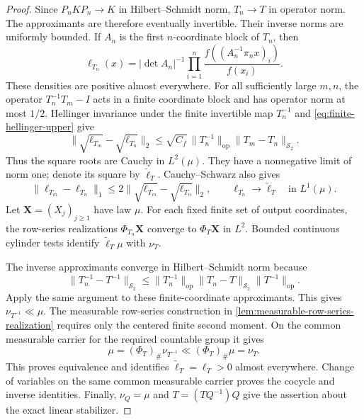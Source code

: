 \begin{proof}
Since $P_nKP_n\to K$ in Hilbert--Schmidt norm, $T_n\to T$ in
operator norm.
The approximants are therefore eventually invertible.
Their inverse norms are uniformly bounded.
If $A_n$ is the first $n$-coordinate block of $T_n$, then
\begin{equation}
 \ell_{T_n}(x)=|\det A_n|^{-1}
     \prod_{i=1}^n\frac{f((A_n^{-1}\pi_n x)_i)}{f(x_i)}.
 \label{eq:finite-approximant-density}
\end{equation}
These densities are positive almost everywhere.
For all sufficiently large $m,n$, the operator $T_n^{-1}T_m-I$
acts in a finite coordinate block and has operator norm at most $1/2$.
Hellinger invariance under the finite invertible map $T_n^{-1}$ and
\eqref{eq:finite-hellinger-upper} give
\begin{equation}
 \|\sqrt{\ell_{T_m}}-\sqrt{\ell_{T_n}}\|_2
 \le\sqrt{C_f}\,\|T_n^{-1}\|_{\mathrm{op}}
                    \|T_m-T_n\|_{\mathcal S_2}.
 \label{eq:approximant-hellinger-cauchy}
\end{equation}
Thus the square roots are Cauchy in $L^2(\mu)$.
They have a nonnegative limit of norm one; denote its square by
$\widetilde\ell_T$.
Cauchy--Schwarz also gives
\begin{equation}
 \|\ell_{T_m}-\ell_{T_n}\|_1
 \le2\|\sqrt{\ell_{T_m}}-\sqrt{\ell_{T_n}}\|_2,
 \qquad \ell_{T_n}\longrightarrow \widetilde\ell_T
       \quad\text{in }L^1(\mu).
 \label{eq:approximant-l1-cauchy}
\end{equation}
Let $\mathbf X=(X_j)_{j\ge1}$ have law $\mu$.
For each fixed finite set of output coordinates, the row-series
realizations $\Phi_{T_n}\mathbf X$ converge to $\Phi_T\mathbf X$ in $L^2$.
Bounded continuous cylinder tests identify $\widetilde\ell_T\mu$ with
$\nu_T$.

The inverse approximants converge in Hilbert--Schmidt norm because
\[
 \|T_n^{-1}-T^{-1}\|_{\mathcal S_2}
 \le\|T_n^{-1}\|_{\mathrm{op}}
       \|T_n-T\|_{\mathcal S_2}\|T^{-1}\|_{\mathrm{op}}.
\]
Apply the same argument to these finite-coordinate approximants.
This gives $\nu_{T^{-1}}\ll\mu$.
The measurable row-series construction in
\cref{lem:measurable-row-series-realization} requires only the centered finite
second moment.
On the common measurable carrier for the required countable group it gives
\[
 \mu=(\Phi_T)_\#\nu_{T^{-1}}
       \ll(\Phi_T)_\#\mu=\nu_T.
\]
This proves equivalence and identifies
$\widetilde\ell_T=\ell_T>0$ almost everywhere.
Change of variables on the same common measurable carrier proves the cocycle
and inverse identities.
Finally, $\nu_Q=\mu$ and $T=(TQ^{-1})Q$ give the assertion about the exact
linear stabilizer.
\end{proof}

